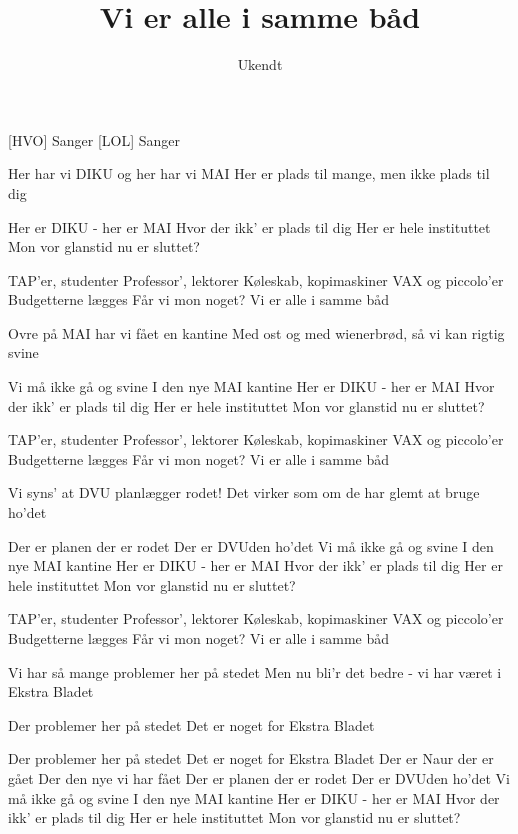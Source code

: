 \documentclass[a4paper,11pt]{article}
\title{Vi er alle i samme båd}
\author{Ukendt}
\begin{document}
\maketitle

\begin{roles}
[HVO] Sanger
[LOL] Sanger
\end{roles}

\begin{song}

 Her har vi DIKU og her har vi MAI
  Her er plads til mange, men ikke plads til dig
  
 Her er DIKU - her er MAI
  Hvor der ikk' er plads til dig
  Her er hele instituttet
  Mon vor glanstid nu er sluttet?

 TAP'er, studenter
  Professor', lektorer
  Køleskab, kopimaskiner
  VAX og piccolo'er
  Budgetterne lægges
  Får vi mon noget?
  Vi er alle i samme båd

 Ovre på MAI har vi fået en kantine
  Med ost og med wienerbrød, så vi kan rigtig svine
  
 Vi må ikke gå og svine
  I den nye MAI kantine
  Her er DIKU - her er MAI
  Hvor der ikk' er plads til dig
  Her er hele instituttet
  Mon vor glanstid nu er sluttet?

 TAP'er, studenter
  Professor', lektorer
  Køleskab, kopimaskiner
  VAX og piccolo'er
  Budgetterne lægges
  Får vi mon noget?
  Vi er alle i samme båd

 Vi syns' at DVU planlægger rodet!
  Det virker som om de har glemt at bruge ho'det

 Der er planen der er rodet
  Der er DVUden ho'det
  Vi må ikke gå og svine
  I den nye MAI kantine
  Her er DIKU - her er MAI
  Hvor der ikk' er plads til dig
  Her er hele instituttet
  Mon vor glanstid nu er sluttet?

 TAP'er, studenter
  Professor', lektorer
  Køleskab, kopimaskiner
  VAX og piccolo'er
  Budgetterne lægges
  Får vi mon noget?
  Vi er alle i samme båd

 Vi har så mange problemer her på stedet
  Men nu bli'r det bedre - vi har været i Ekstra Bladet

 Der problemer her på stedet
  Det er noget for Ekstra Bladet
  
 Der problemer her på stedet
  Det er noget for Ekstra Bladet
  Der er Naur der er gået
  Der den nye vi har fået
  Der er planen der er rodet
  Der er DVUden ho'det
  Vi må ikke gå og svine
  I den nye MAI kantine
  Her er DIKU - her er MAI
  Hvor der ikk' er plads til dig
  Her er hele instituttet
  Mon vor glanstid nu er sluttet?


\end{song}
\end{document}

